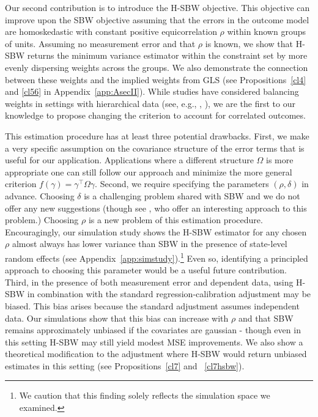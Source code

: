 \documentclass[aoas]{imsart}
\theoremstyle{plain}
\theoremstyle{remark}
\begin{document}
Our second contribution is to introduce the H-SBW objective. This objective can improve upon the SBW objective assuming that the errors in the outcome model are homoskedastic with constant positive equicorrelation $\rho$ within known groups of units. Assuming no measurement error and that $\rho$ is known, we show that H-SBW returns the minimum variance estimator within the constraint set by more evenly dispersing weights across the groups. We also demonstrate the connection between these weights and the implied weights from GLS (see Propositions~\ref{cl4} and \ref{cl56} in Appendix~\ref{app:AsecII}). While studies have considered balancing weights in settings with hierarchical data (see, e.g., \cite{keele2020hospital}, \cite{ben2021multilevel}), we are the first to our knowledge to propose changing the criterion to account for correlated outcomes.

This estimation procedure has at least three potential drawbacks. First, we make a very specific assumption on the covariance structure of the error terms that is useful for our application. Applications where a different structure $\Omega$ is more appropriate one can still follow our approach and minimize the more general criterion $f(\gamma) = \gamma^\top\Omega\gamma$. Second, we require specifying the parameters $(\rho, \delta)$ in advance. Choosing $\delta$ is a challenging problem shared with SBW and we do not offer any new suggestions (though see \cite{wang2020minimal}, who offer an interesting approach to this problem.) Choosing $\rho$ is a new problem of this estimation procedure. Encouragingly, our simulation study shows the H-SBW estimator for any chosen $\rho$ almost always has lower variance than SBW in the presence of state-level random effects (see Appendix~\ref{app:simstudy}).\footnote{We caution that this finding solely reflects the simulation space we examined.} Even so, identifying a principled approach to choosing this parameter would be a useful future contribution. Third, in the presence of both measurement error and dependent data, using H-SBW in combination with the standard regression-calibration adjustment may be biased. This bias arises because the standard adjustment assumes independent data. Our simulations show that this bias can increase with $\rho$ and that SBW remains approximately unbiased if the covariates are gaussian - though even in this setting H-SBW may still yield modest MSE improvements. We also show a theoretical modification to the adjustment where H-SBW would return unbiased estimates in this setting (see Propositions~\ref{cl7} and ~\ref{cl7hsbw}).
\end{document}
